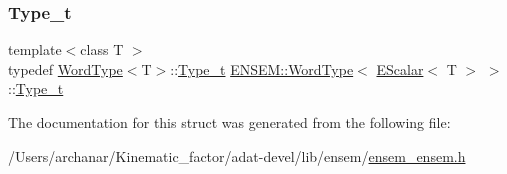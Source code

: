 \subsubsection{\texorpdfstring{Type\_t}{Type\_t}\hspace{0.1cm}{\footnotesize\ttfamily [3/3]}}
{\footnotesize\ttfamily template$<$class T $>$ \\
typedef \mbox{\hyperlink{structENSEM_1_1WordType}{Word\+Type}}$<$T$>$\+::\mbox{\hyperlink{structENSEM_1_1WordType_3_01EScalar_3_01T_01_4_01_4_adc30dc1892bde666c3cbe7a8ea951497}{Type\+\_\+t}} \mbox{\hyperlink{structENSEM_1_1WordType}{E\+N\+S\+E\+M\+::\+Word\+Type}}$<$ \mbox{\hyperlink{classENSEM_1_1EScalar}{E\+Scalar}}$<$ T $>$ $>$\+::\mbox{\hyperlink{structENSEM_1_1WordType_3_01EScalar_3_01T_01_4_01_4_adc30dc1892bde666c3cbe7a8ea951497}{Type\+\_\+t}}}



The documentation for this struct was generated from the following file\+:\begin{DoxyCompactItemize}
\item 
/\+Users/archanar/\+Kinematic\+\_\+factor/adat-\/devel/lib/ensem/\mbox{\hyperlink{adat-devel_2lib_2ensem_2ensem__ensem_8h}{ensem\+\_\+ensem.\+h}}\end{DoxyCompactItemize}
